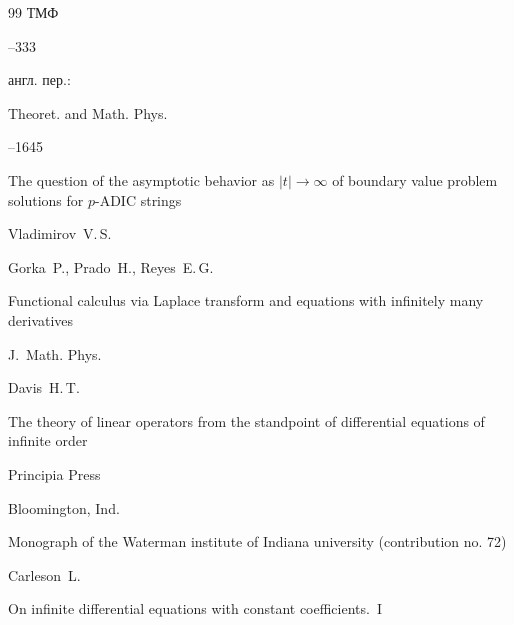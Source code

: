 \begin{thebibliography}{99}
\jour ТМФ




--333

\transl

англ. пер.:~

\jour Theoret. and Math. Phys.




--1645

\paper The question of the asymptotic behavior as $|t|\to\infty$ of boundary value problem solutions for $p$-ADIC strings

\by Vladimirov~V.\,S.








\by  Gorka~P.,  Prado~H.,  Reyes~E.\,G.

\paper Functional calculus via Laplace transform and equations with infinitely many derivatives

\jour J.~Math. Phys. 










\by Davis~H.\,T. 


\book The theory of linear operators from the standpoint of differential equations of infinite order

\publ Principia Press

\publaddr Bloomington, Ind.

\serial Monograph of the Waterman institute of Indiana university (contribution no. 72)







\by  Carleson~L.


\paper On infinite differential equations with constant coefficients.~I


\end{thebibliography}
